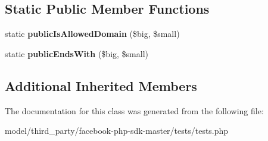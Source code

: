 \subsection*{Static Public Member Functions}
\begin{DoxyCompactItemize}
\item 
\hypertarget{classPersistentFBPublic_a31b29a37bcadfc18e9623146fbc4fda2}{static {\bfseries public\-Is\-Allowed\-Domain} (\$big, \$small)}\label{classPersistentFBPublic_a31b29a37bcadfc18e9623146fbc4fda2}

\item 
\hypertarget{classPersistentFBPublic_a2626c8e1bdfbb5482725e80a95399e05}{static {\bfseries public\-Ends\-With} (\$big, \$small)}\label{classPersistentFBPublic_a2626c8e1bdfbb5482725e80a95399e05}

\end{DoxyCompactItemize}
\subsection*{Additional Inherited Members}


The documentation for this class was generated from the following file\-:\begin{DoxyCompactItemize}
\item 
model/third\-\_\-party/facebook-\/php-\/sdk-\/master/tests/tests.\-php\end{DoxyCompactItemize}
